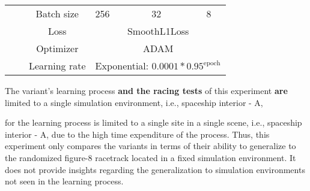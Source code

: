 \begin{table}[h]
\begin{tabular}{|c|c|c|c|p{\wcols}|p{\wcols}|p{\wcols}|p{\wcols}|p{\wcols}|}
        \\\cline{3-9}
        &
        &\multicolumn{2}{c|}{Batch size}
        &256
        &32
        &\multicolumn{3}{c|}{8}
        \\\cline{3-9}
        &
        &\multicolumn{2}{c|}{Loss}
        &\multicolumn{5}{c|}{SmoothL1Loss}
        \\\cline{3-9}
        &
        &\multicolumn{2}{c|}{Optimizer}
        &\multicolumn{5}{c|}{ADAM}
        \\\cline{3-9}
        &
        &\multicolumn{2}{c|}{Learning rate}
        &\multicolumn{5}{c|}{Exponential: $0.0001*0.95^\text{epoch}$}
        \\\hline
    \end{tabular}
\end{table}
The variant's learning process \textbf{and the racing tests} of this experiment
\textbf{are} limited to a single simulation environment,
i.e., spaceship interior - A,


for the learning process
is limited to a single site in a single scene,
i.e., spaceship interior - A,
due to the high time expenditure of the process.
Thus, 
this experiment only compares the variants 
in terms of their ability to generalize 
to the randomized figure-8 racetrack
located in a fixed simulation environment.
It does not provide insights 
regarding the generalization to simulation environments 
not seen in the learning process.

